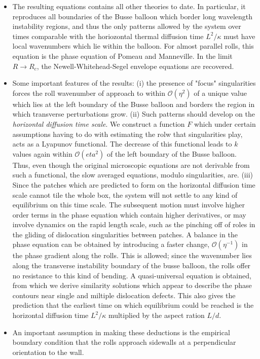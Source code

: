\documentclass[12pt]{article}
\newcounter{solution}
\begin{document}
\begin{itemize}
    \item The resulting equations contains all other theories to date. In particular, it reproduces all boundaries of the Busse balloon which border long wavelength instability regions, and thus the only patterns allowed by the system over times comparable with the horiozontal thermal diffusion time $L^2/\kappa$ must have local wavenumbers which lie within the balloon. For almost parallel rolls, this equation is the phase equation of Pomeau and Manneville. In the limit $R \rightarrow R_c$, the Newell-Whitehead-Segel envelope equations are recovered. 
    \item Some important features of the results: (i) the presence of "focus" singularities forces the roll wavenumber of approach to within $\mathcal{O}(\eta^2)$ of a unique value which lies at the left boundary of the Busse balloon and borders the region in which transverse perturbations grow. (ii) Such patterns should develop on the \emph{horizontal diffusion time scale}. We construct a function $F$ which under certain assumptions having to do with estimating the rolw that singularities play, acts as a Lyapunov functional. The decrease of this functional leads to $k$ values again within $\mathcal{O}(eta^2)$ of the left boundary of the Busse balloon. Thus, even though the original microscopic equations are not derivable from such a functional, the slow averaged equations, modulo singularities, are. (iii) Since the patches which are predicted to form on the horizontal diffusion time scale cannot tile the whole box, the system will not settle to any kind of equilibrium on this time scale. The subsequent motion must involve higher order terms in the phase equation which contain higher derivatives, or may involve dynamics on the rapid length scale, such as the pinching off of roles in the gliding of dislocation singularities between patches. A balance in the phase equation can be obtained by introducing a faster change, $\mathcal{O}(\eta^{-1})$ in the phase gradient along the rolls. This is allowed; since the wavenumber lies along the transverse instability boundary of the busse balloon, the rolls offer no resistance to this kind of bending. A quasi-universal equation is obtained, from which we derive similarity solutions which appear to describe the phase contours near single and miltiple dislocation defects. This also gives the prediction that the earliest time on which equilibrium could be reached is the horizontal diffusion time $L^2/\kappa$ multiplied by the aspect ration $L/d$.
    \item An important assumption in making these deductions is the empirical boundary condition that the rolls approach sidewalls at a perpendicular orientation to the wall.

\end{itemize}
\end{document}
